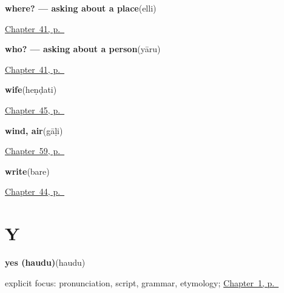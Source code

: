 \noindent\begin{minipage}[t]{\linewidth}
\raggedright
\textbf{where? — asking about a place}\enspace\emph{}\enspace(elli)\par
\footnotesize \hyperref[ch:kn-pointing-and-asking]{Chapter~41, p.~\pageref*{ch:kn-pointing-and-asking}}
\end{minipage}\par\smallskip

\noindent\begin{minipage}[t]{\linewidth}
\raggedright
\textbf{who? — asking about a person}\enspace\emph{}\enspace(yāru)\par
\footnotesize \hyperref[ch:kn-pointing-and-asking]{Chapter~41, p.~\pageref*{ch:kn-pointing-and-asking}}
\end{minipage}\par\smallskip

\noindent\begin{minipage}[t]{\linewidth}
\raggedright
\textbf{wife}\enspace\emph{}\enspace(heṇḍati)\par
\footnotesize \hyperref[ch:ka-older-generation]{Chapter~45, p.~\pageref*{ch:ka-older-generation}}
\end{minipage}\par\smallskip

\noindent\begin{minipage}[t]{\linewidth}
\raggedright
\textbf{wind, air}\enspace\emph{}\enspace(gāḷi)\par
\footnotesize \hyperref[ch:ka-weather-ground]{Chapter~59, p.~\pageref*{ch:ka-weather-ground}}
\end{minipage}\par\smallskip

\noindent\begin{minipage}[t]{\linewidth}
\raggedright
\textbf{write}\enspace\emph{}\enspace(bare)\par
\footnotesize \hyperref[ch:ka-see-say]{Chapter~44, p.~\pageref*{ch:ka-see-say}}
\end{minipage}\par\smallskip

\section*{Y}

\noindent\begin{minipage}[t]{\linewidth}
\raggedright
\textbf{yes (haudu)}\enspace\emph{}\enspace(haudu)\par
\footnotesize explicit focus: pronunciation, script, grammar, etymology; \hyperref[ch:greetings]{Chapter~1, p.~\pageref*{ch:greetings}}
\end{minipage}\par\smallskip

